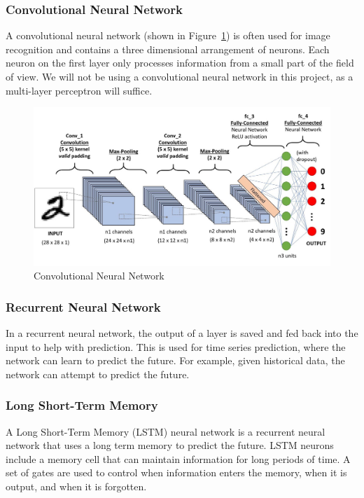 \documentclass[titlepage]{article}
\begin{document}
\subsubsection{Convolutional Neural Network}
A convolutional neural network\cite{convolutionalnn} (shown in Figure~\ref{fig:convolutional_neural_network}) is often used for image recognition and contains a three dimensional arrangement of neurons. Each neuron on the first layer only processes information from a small part of the field of view. We will not be using a convolutional neural network in this project, as a multi-layer perceptron will suffice.

\begin{figure}[h!]
    \includegraphics[width=\textwidth]{./assets/convolutional2.jpeg}
    \caption{Convolutional Neural Network}
    \label{fig:convolutional_neural_network}
\end{figure}

\subsubsection{Recurrent Neural Network}
In a recurrent neural network, the output of a layer is saved and fed back into the input to help with prediction. This is used for time series prediction, where the network can learn to predict the future. For example, given historical data, the network can attempt to predict the future.

\subsubsection{Long Short-Term Memory}
A Long Short-Term Memory (LSTM) neural network is a recurrent neural network that uses a long term memory to predict the future. LSTM neurons include a memory cell that can maintain information for long periods of time. A set of gates are used to control when information enters the memory, when it is output, and when it is forgotten.
\end{document}
